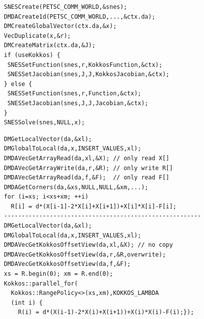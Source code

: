 \documentclass[5p,times]{elsarticle}
\begin{document}
\begin{lstlisting}[caption={Main application code for CPU or GPU},label={lst:main},frame=single,captionpos=b]
SNESCreate(PETSC_COMM_WORLD,&snes);
DMDACreate1d(PETSC_COMM_WORLD,...,&ctx.da);
DMCreateGlobalVector(ctx.da,&x); 
VecDuplicate(x,&r); 
DMCreateMatrix(ctx.da,&J); 
if (useKokkos) {
 SNESSetFunction(snes,r,KokkosFunction,&ctx); 
 SNESSetJacobian(snes,J,J,KokkosJacobian,&ctx); 
} else {
 SNESSetFunction(snes,r,Function,&ctx); 
 SNESSetJacobian(snes,J,J,Jacobian,&ctx); 
}
SNESSolve(snes,NULL,x); 
\end{lstlisting}

\begin{lstlisting}[caption={Traditional PETSc Function (top) and Kokkos version (bottom). {\tt xl}, {\tt x}, {\tt r}, {\tt f} are PETSc vectors. {\tt X}, {\tt R}, {\tt F} at the top are {\tt double*} or {\tt const double*} like pointers but at the bottom are Kokkos unmanaged {\tt OffsetView}s.},label={lst:function},frame=single,captionpos=b]
DMGetLocalVector(da,&xl);
DMGlobalToLocal(da,x,INSERT_VALUES,xl);
DMDAVecGetArrayRead(da,xl,&X); // only read X[]
DMDAVecGetArrayWrite(da,r,&R); // only write R[]
DMDAVecGetArrayRead(da,f,&F);  // only read F[]
DMDAGetCorners(da,&xs,NULL,NULL,&xm,...);
for (i=xs; i<xs+xm; ++i)
  R[i] = d*(X[i-1]-2*X[i]+X[i+1])+X[i]*X[i]-F[i];
--------------------------------------------------------
DMGetLocalVector(da,&xl);
DMGlobalToLocal(da,x,INSERT_VALUES,xl);
DMDAVecGetKokkosOffsetView(da,xl,&X); // no copy
DMDAVecGetKokkosOffsetView(da,r,&R,overwrite);
DMDAVecGetKokkosOffsetView(da,f,&F);
xs = R.begin(0); xm = R.end(0);
Kokkos::parallel_for( 
  Kokkos::RangePolicy<>(xs,xm),KOKKOS_LAMBDA 
  (int i) {
    R(i) = d*(X(i-1)-2*X(i)+X(i+1))+X(i)*X(i)-F(i);});
\end{lstlisting}
\end{document}
